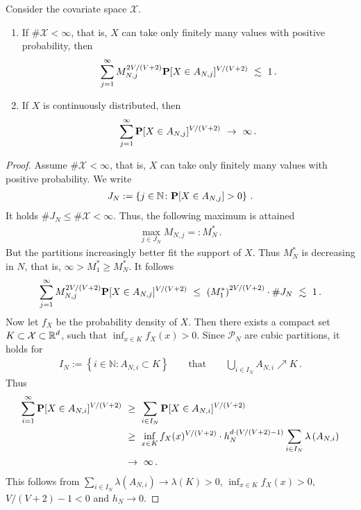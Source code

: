 \begin{lemma}
  Consider the covariate space $\mathcal{X}$. 
  \begin{enumerate}[label=(\roman*)]
    \item
If $\#\mathcal{X}<\infty$, that is, $X$ can take only finitely many values with positive probability,
then 
\begin{align*}
  \sum_{j=1}^{\infty} 
  M_{N,j}^{2V/(V+2)}
  \P
  [
  X\in A_{N,j}
  ]^{V/(V+2)}
  \ 
  \lesssim
  \ 
  1
  \,.
\end{align*}
\item
  If $X$ is continuously distributed, then
  \begin{align*}
  \sum_{j=1}^{\infty} 
  \P
  [
  X\in A_{N,j}
  ]^{V/(V+2)}
  \ 
  \to
  \ 
  \infty
  \,.
  \end{align*}
  \end{enumerate}
\end{lemma}

\begin{proof}
 Assume $\#\mathcal{X}<\infty$, that is, $X$ can take only finitely many values with positive probability.
We write
\begin{gather*}
  J_N
  :=
  \left\{ 
    j\in\mathbb{N}
    \colon
    \P[X\in A_{N,j}]>0
  \right\}
  \,.
\end{gather*}
It holds
$\#J_N\le \# \mathcal{X}<\infty$.
Thus, the following maximum is attained
\begin{gather*}
  \max_{j\in J_N} M_{N,j}
  =:M^*_N
  \,.
\end{gather*}
But the partitions increasingly better fit the support of $X$. Thus
$M^*_N$ is decreasing in $N$, that is,  $\infty>M^*_1\ge M^*_N$.
It follows
\begin{align*}
  \sum_{j=1}^{\infty} 
  M_{N,j}
  ^{2V/(V+2)}
  \P
  [
  X\in A_{N,j}
  ]^{V/(V+2)}
  \ 
  \le
  \ 
  \left( 
  M^*_1
  \right)
  ^{2V/(V+2)}
  \cdot
  \# J_N
  \ 
  \lesssim
  \ 
  1
  \,.
\end{align*}
Now let $f_X$ be the probability density of $X$. 
  Then there exists a compact set $K\subset\mathcal{X}\subset \R^d$, such that
  $
  \inf_{x\in K}f_X(x)
  >0
  $. Since $\mathcal{P}_N$ are cubic partitions, it holds for 
  \begin{gather*}
    I_N
    :=
    \left\{ 
      i\in\mathbb{N}\colon
      A_{N,i}\subset K
    \right\}
    \qquad
    \text{that}
    \qquad
    \bigcup_{i\in I_N}A_{N,i}\nearrow K
    \,.
  \end{gather*}
Thus
\begin{align*}
  \sum_{i=1}^\infty
  \P
  [
  X\in A_{N,i}
  ]^{V/(V+2)}
  &
  \ 
  \ge
  \ 
  \sum_{i\in I_N}
  \P
  [
  X\in A_{N,i}
  ]^{V/(V+2)}
  \\
  &
  \ 
  \ge
  \ 
  \inf_{x\in K}f_X(x)
  ^{V/(V+2)}
  \cdot 
  h_N^{d\cdot(V/(V+2)-1)}
  \sum_{i\in I_N}
  \lambda
  \left( 
  A_{N,i}
  \right)
  \\
  &
  \ 
  \to
  \ 
  \infty
  \,.
\end{align*}
This follows from
$
  \sum_{i\in I_N}
  \lambda
  \left( 
  A_{N,i}
  \right)
  \to 
  \lambda(K)>0
$,
  $
  \inf_{x\in K}f_X(x)
  >0
  $,
  $V/(V+2)-1<0$ and $h_N\to 0$.


\end{proof}
